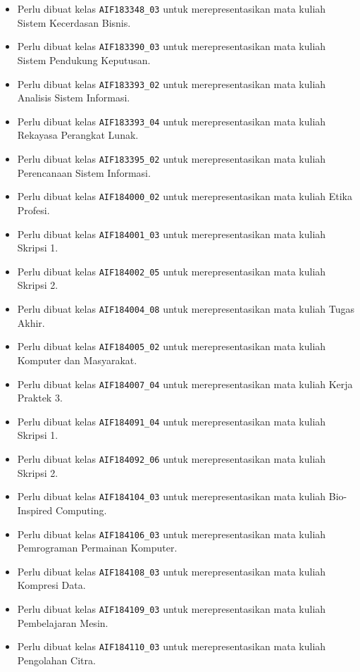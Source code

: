 \begin{enumerate}
\begin{itemize}
		\item Perlu dibuat kelas \texttt{AIF183348\_03} untuk merepresentasikan mata kuliah Sistem Kecerdasan Bisnis.
		\item Perlu dibuat kelas \texttt{AIF183390\_03} untuk merepresentasikan mata kuliah Sistem Pendukung Keputusan.
		\item Perlu dibuat kelas \texttt{AIF183393\_02} untuk merepresentasikan mata kuliah Analisis Sistem Informasi.
		\item Perlu dibuat kelas \texttt{AIF183393\_04} untuk merepresentasikan mata kuliah Rekayasa Perangkat Lunak.
		\item Perlu dibuat kelas \texttt{AIF183395\_02} untuk merepresentasikan mata kuliah Perencanaan Sistem Informasi.
		\item Perlu dibuat kelas \texttt{AIF184000\_02} untuk merepresentasikan mata kuliah Etika Profesi.
		\item Perlu dibuat kelas \texttt{AIF184001\_03} untuk merepresentasikan mata kuliah Skripsi 1.
		\item Perlu dibuat kelas \texttt{AIF184002\_05} untuk merepresentasikan mata kuliah Skripsi 2.
		\item Perlu dibuat kelas \texttt{AIF184004\_08} untuk merepresentasikan mata kuliah Tugas Akhir.
		\item Perlu dibuat kelas \texttt{AIF184005\_02} untuk merepresentasikan mata kuliah Komputer dan Masyarakat.
		\item Perlu dibuat kelas \texttt{AIF184007\_04} untuk merepresentasikan mata kuliah Kerja Praktek 3.
		\item Perlu dibuat kelas \texttt{AIF184091\_04} untuk merepresentasikan mata kuliah Skripsi 1.
		\item Perlu dibuat kelas \texttt{AIF184092\_06} untuk merepresentasikan mata kuliah Skripsi 2.
		\item Perlu dibuat kelas \texttt{AIF184104\_03} untuk merepresentasikan mata kuliah Bio-Inspired Computing.
		\item Perlu dibuat kelas \texttt{AIF184106\_03} untuk merepresentasikan mata kuliah Pemrograman Permainan Komputer.
		\item Perlu dibuat kelas \texttt{AIF184108\_03} untuk merepresentasikan mata kuliah Kompresi Data.
		\item Perlu dibuat kelas \texttt{AIF184109\_03} untuk merepresentasikan mata kuliah Pembelajaran Mesin.
		\item Perlu dibuat kelas \texttt{AIF184110\_03} untuk merepresentasikan mata kuliah Pengolahan Citra.

\end{itemize}
\end{enumerate}
